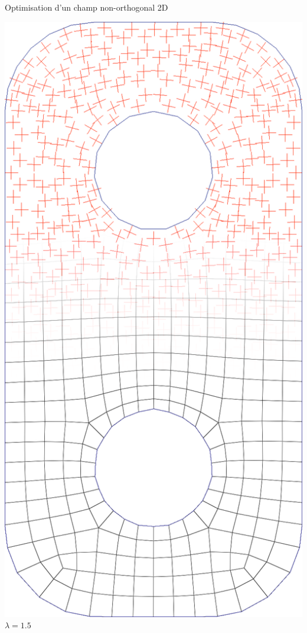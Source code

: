 \begin{frame}{Optimisation d'un champ non-orthogonal 2D}
\begin{minipage}[b]{0.15\textwidth}
        \centering
        \includegraphics[width=\textwidth]{img_spm_ff/perced_25}
        $\lambda = 1.5$
    \end{minipage}
\end{frame} 

